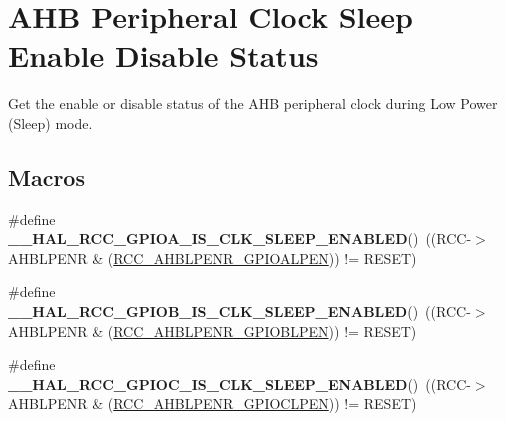 \hypertarget{group___r_c_c___a_h_b___clock___sleep___enable___disable___status}{\section{A\-H\-B Peripheral Clock Sleep Enable Disable Status}
\label{group___r_c_c___a_h_b___clock___sleep___enable___disable___status}
}


Get the enable or disable status of the A\-H\-B peripheral clock during Low Power (Sleep) mode.  


\subsection*{Macros}
\begin{DoxyCompactItemize}
\item 
\hypertarget{group___r_c_c___a_h_b___clock___sleep___enable___disable___status_gabfca340e2266b35f9eb8bda9f24fb272}{\#define {\bfseries \-\_\-\-\_\-\-H\-A\-L\-\_\-\-R\-C\-C\-\_\-\-G\-P\-I\-O\-A\-\_\-\-I\-S\-\_\-\-C\-L\-K\-\_\-\-S\-L\-E\-E\-P\-\_\-\-E\-N\-A\-B\-L\-E\-D}()~((R\-C\-C-\/$>$A\-H\-B\-L\-P\-E\-N\-R \& (\hyperlink{group___peripheral___registers___bits___definition_ga8fdb2dae547fe9b89381c894ae21e08a}{R\-C\-C\-\_\-\-A\-H\-B\-L\-P\-E\-N\-R\-\_\-\-G\-P\-I\-O\-A\-L\-P\-E\-N})) != R\-E\-S\-E\-T)}\label{group___r_c_c___a_h_b___clock___sleep___enable___disable___status_gabfca340e2266b35f9eb8bda9f24fb272}

\item 
\hypertarget{group___r_c_c___a_h_b___clock___sleep___enable___disable___status_gae5f9c8d570ca5ce52bd3d1766ad96265}{\#define {\bfseries \-\_\-\-\_\-\-H\-A\-L\-\_\-\-R\-C\-C\-\_\-\-G\-P\-I\-O\-B\-\_\-\-I\-S\-\_\-\-C\-L\-K\-\_\-\-S\-L\-E\-E\-P\-\_\-\-E\-N\-A\-B\-L\-E\-D}()~((R\-C\-C-\/$>$A\-H\-B\-L\-P\-E\-N\-R \& (\hyperlink{group___peripheral___registers___bits___definition_ga1943c1a7faf87f869a4a381bb17fb0ea}{R\-C\-C\-\_\-\-A\-H\-B\-L\-P\-E\-N\-R\-\_\-\-G\-P\-I\-O\-B\-L\-P\-E\-N})) != R\-E\-S\-E\-T)}\label{group___r_c_c___a_h_b___clock___sleep___enable___disable___status_gae5f9c8d570ca5ce52bd3d1766ad96265}

\item 
\hypertarget{group___r_c_c___a_h_b___clock___sleep___enable___disable___status_ga91d9bb261e4eb51ae5c83276ca94ba9e}{\#define {\bfseries \-\_\-\-\_\-\-H\-A\-L\-\_\-\-R\-C\-C\-\_\-\-G\-P\-I\-O\-C\-\_\-\-I\-S\-\_\-\-C\-L\-K\-\_\-\-S\-L\-E\-E\-P\-\_\-\-E\-N\-A\-B\-L\-E\-D}()~((R\-C\-C-\/$>$A\-H\-B\-L\-P\-E\-N\-R \& (\hyperlink{group___peripheral___registers___bits___definition_ga31961dd470a5be30373cd496ae6da055}{R\-C\-C\-\_\-\-A\-H\-B\-L\-P\-E\-N\-R\-\_\-\-G\-P\-I\-O\-C\-L\-P\-E\-N})) != R\-E\-S\-E\-T)}\label{group___r_c_c___a_h_b___clock___sleep___enable___disable___status_ga91d9bb261e4eb51ae5c83276ca94ba9e}


\end{DoxyCompactItemize}
